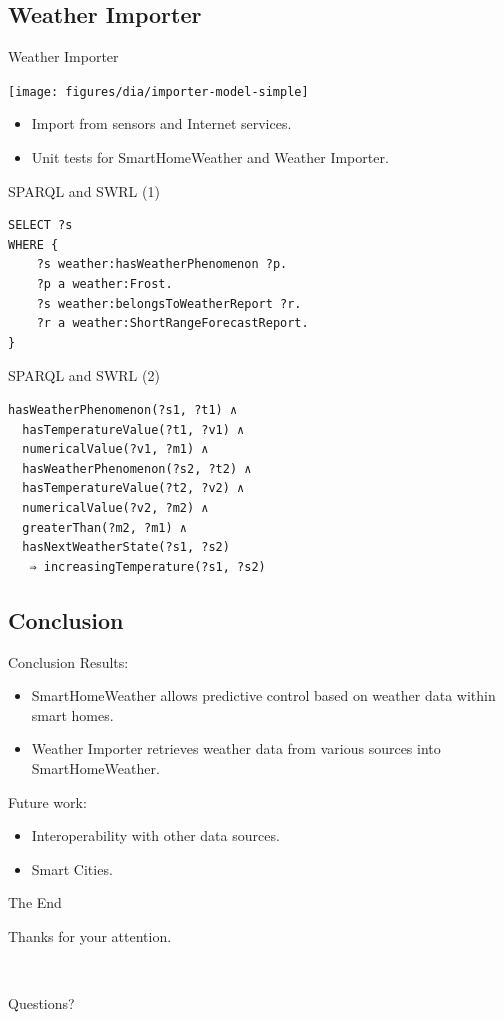 \documentclass{beamer}
\begin{document}
\subsection{Weather Importer}

\begin{frame}{Weather Importer}
	\begin{center}
		\texttt{[image: figures/dia/importer-model-simple]}
	\end{center}

	\begin{itemize}
		\item Import from sensors and Internet services.
		\item Unit tests for SmartHomeWeather and Weather Importer.
	\end{itemize}
\end{frame}

\begin{frame}[fragile]{SPARQL and SWRL (1)}
	\begin{framed}
		\begin{verbatim}
SELECT ?s
WHERE {
    ?s weather:hasWeatherPhenomenon ?p.
    ?p a weather:Frost.
    ?s weather:belongsToWeatherReport ?r.
    ?r a weather:ShortRangeForecastReport.
}
		\end{verbatim}
	\end{framed}
\end{frame}

\begin{frame}[fragile]{SPARQL and SWRL (2)}
	\begin{framed}
		\begin{verbatim}
hasWeatherPhenomenon(?s1, ?t1) ∧
  hasTemperatureValue(?t1, ?v1) ∧
  numericalValue(?v1, ?m1) ∧
  hasWeatherPhenomenon(?s2, ?t2) ∧
  hasTemperatureValue(?t2, ?v2) ∧
  numericalValue(?v2, ?m2) ∧
  greaterThan(?m2, ?m1) ∧
  hasNextWeatherState(?s1, ?s2)
   ⇒ increasingTemperature(?s1, ?s2)
		\end{verbatim}
	\end{framed}
\end{frame}

\subsection{Conclusion}

\begin{frame}{Conclusion}
	Results:
	\begin{itemize}
		\item SmartHomeWeather allows predictive control based on weather data within smart homes.
		\item Weather Importer retrieves weather data from various sources into SmartHomeWeather.
	\end{itemize}

	Future work:
	\begin{itemize}
		\item Interoperability with other data sources.
		\item Smart Cities.
	\end{itemize}
\end{frame}

\begin{frame}{The End}
	\begin{center}
		Thanks for your attention.

		~

		Questions?
	\end{center}
\end{frame}
\end{document}
